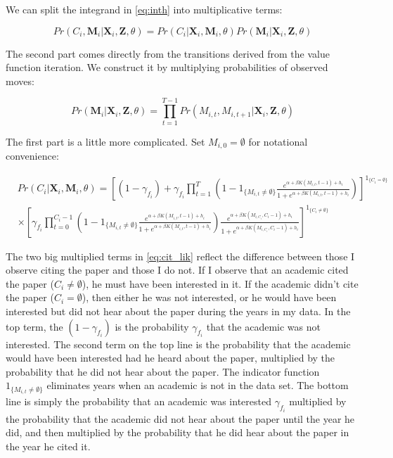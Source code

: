 We can split the integrand in \eqref{eq:inth} into multiplicative terms:

\begin{equation}
    Pr(C_i,\mathbf{M}_i|\mathbf{X}_i,\mathbf{Z}, \theta) = Pr(C_i|\mathbf{X}_i, \mathbf{M}_i, \theta) Pr(\mathbf{M}_i|\mathbf{X}_i, \mathbf{Z}, \theta)
\end{equation}

The second part comes directly from the transitions derived from the
value function iteration.  We construct it by multiplying probabilities of observed
moves:\footnotemark{}

\begin{equation}
    Pr(\mathbf{M}_i|\mathbf{X}_i,\mathbf{Z},\theta) = \prod_{t = 1}^{T-1} Pr(M_{i,t}, M_{i,t+1}\vert \mathbf{X}_i, \mathbf{Z}, \theta)
    \label{eq:mov_liks}
\end{equation}

The first part is a little more complicated. Set $M_{i,0} = \emptyset$ for notational convenience:

\begin{align}
    &Pr(C_i|\mathbf{X}_i, \mathbf{M}_i, \theta) = \left[\left(1 - \gamma_{f_{i}}\right) + \gamma_{f_{i}} \prod_{t=1}^T \left(1 - 1_{\{M_{i,t}\neq \emptyset\}} \frac{e^{\alpha + \beta K(M_{i,t},t-1) + h_i}}{1 + e^{\alpha + \beta K(M_{i,t},t-1) + h_i}}\right)\right]^{1_{\{C_i = \emptyset\}}} \nonumber \\
    &\times \left[\gamma_{f_{i}} \prod_{t=0}^{C_i - 1} \left(1 - 1_{\{M_{i,t}\neq \emptyset\}} \frac{e^{\alpha + \beta K(M_{i,t},t-1) + h_i}}{1 + e^{\alpha + \beta K(M_{i,t},t-1) + h_i}}\right) \frac{e^{\alpha + \beta K(M_{i,C_i},C_i-1) + h_i}}{1 + e^{\alpha + \beta K(M_{i,C_i},C_i-1) + h_i}}\right]^{1_{\{C_i \neq \emptyset\}}}
    \label{eq:cit_lik}
\end{align}

The two big multiplied terms in \eqref{eq:cit_lik} reflect the
difference between those I observe citing the paper and those I do not.
If I observe that an academic cited the paper ($C_i \neq \emptyset$), he must have been
interested in it. If the academic didn't cite the paper ($C_i = \emptyset$), then either he was not
interested, or he would have been interested but did not hear about the paper during 
the years in my data. In the top term, the $(1 - \gamma_{f_i})$ is the probability $\gamma_{f_i}$
that the academic was not interested. The second term on the top line is the probability that
the academic would have been interested had he heard about the paper,
multiplied by the probability that he did not hear about the paper.  The indicator function $1_{\{M_{i,t}\neq \emptyset\}}$
eliminates years when an academic is not in the data set.  The bottom line is
simply the probability that an academic was interested $\gamma_{f_i}$ multiplied
by the probability that the academic did not hear about the paper until
the year he did, and then multiplied by the probability that he did hear
about the paper in the year he cited it.

